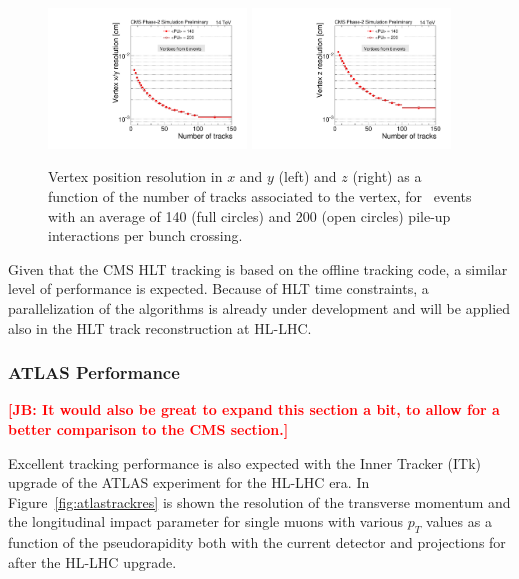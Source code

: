 \begin{figure}[h!tbp]
\begin{center}
  \includegraphics[width=0.47\textwidth]{figures/cmsupgrade/TDR-17-001_fig6_13_a_RecoAllAssoc2GenMatched_ResolX_vs_NumTracks_Sigma_PU.pdf} \hfill
  \includegraphics[width=0.47\textwidth]{figures/cmsupgrade/TDR-17-001_fig6_13_b_RecoAllAssoc2GenMatched_ResolZ_vs_NumTracks_Sigma_PU.pdf}
  \caption{Vertex position resolution in $x$ and $y$ (left) and $z$ (right) as a function of the number of tracks associated to the vertex, for \ttbar~events with an average of 140 (full circles) and 200 (open circles) pile-up interactions per bunch crossing. 
 }
  \label{fig:cmsvertex}
\end{center}
\end{figure}

Given that the CMS HLT tracking is based on the offline tracking code, a similar level of performance is expected.
Because of HLT time constraints, a parallelization of the algorithms is already under development and will be applied also in the HLT track reconstruction at HL-LHC.

\subsubsection{ATLAS Performance}

{\bf \textcolor{red}{[JB: It would also be great to expand this section a bit, to allow for a better comparison to the CMS section.]}}

Excellent tracking performance is also expected with the Inner Tracker (ITk) upgrade of the ATLAS experiment for the HL-LHC era.
In Figure~\ref{fig:atlastrackres} is shown the resolution of the transverse momentum and the longitudinal impact parameter for single muons with various $p_T$ values as a function of the pseudorapidity both with the current
detector and projections for after the HL-LHC upgrade.

